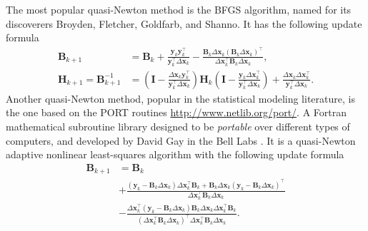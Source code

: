 The most popular quasi-Newton method is the BFGS algorithm, named for
its discoverers Broyden, Fletcher, Goldfarb, and Shanno. It has the
following update formula
\begin{align*}
  \mathbf{B}_{k+1} &= \mathbf{B}_{k} +
                     \frac{\mathbf{y}_{k}\mathbf{y}_{k}^{\top}}{
                     \mathbf{y}_{k}^{\top}\Delta\bm{x}_{k}} -
                     \frac{\mathbf{B}_{k}\Delta\bm{x}_{k}
                     (\mathbf{B}_{k}\Delta\bm{x}_{k})^{\top}}{
                     \Delta\bm{x}_{k}^{\top}\mathbf{B}_{k}
                     \Delta\bm{x}_{k}},\\
  \mathbf{H}_{k+1} = \mathbf{B}_{k+1}^{-1}
                   &= \left(
                     \mathbf{I} -
                     \frac{\Delta\bm{x}_{k}\mathbf{y}_{k}^{\top}}{
                     \mathbf{y}_{k}^{\top}\Delta\bm{x}_{k}}
                     \right) \mathbf{H}_{k}
                     \left(
                     \mathbf{I} -
                     \frac{\mathbf{y}_{k}\Delta\bm{x}_{k}^{\top}}{
                     \mathbf{y}_{k}^{\top}\Delta\bm{x}_{k}}
                     \right) +
                     \frac{\Delta\bm{x}_{k}
                     \Delta\bm{x}_{k}^{\top}}{
                     \mathbf{y}_{k}^{\top}\Delta\bm{x}_{k}}.
\end{align*}
Another quasi-Newton method, popular in the statistical modeling
literature, is the one based on the PORT routines
\url{http://www.netlib.org/port/}. A Fortran mathematical subroutine
library designed to be \textit{portable} over different types of
computers, and developed by David Gay in the Bell Labs
\cite{PORTreport}. It is a quasi-Newton adaptive nonlinear least-squares
algorithm \cite{PORTpaper} with the following update formula
\begin{align*}
  \mathbf{B}_{k+1} &= \mathbf{B}_{k}\\
                   &+ \frac{
                     \left(\mathbf{y}_{k} -
                     \mathbf{B}_{k}\Delta\bm{x}_{k}\right)
                     \Delta\bm{x}_{k}^{\top}\mathbf{B}_{k} +
                     \mathbf{B}_{k}\Delta\bm{x}_{k}
                     \left(\mathbf{y}_{k} -
                     \mathbf{B}_{k}\Delta\bm{x}_{k}\right)^{\top}}{
                     \Delta\bm{x}_{k}^{\top}\mathbf{B}_{k}
                     \Delta\bm{x}_{k}}\\
                   &- \frac{\Delta\bm{x}_{k}^{\top}
                     \left(\mathbf{y}_{k} -
                     \mathbf{B}_{k}\Delta\bm{x}_{k}\right)
                     \mathbf{B}_{k}\Delta\bm{x}_{k}
                     \Delta\bm{x}_{k}^{\top}\mathbf{B}_{k}}{
                     \left(\Delta\bm{x}_{k}^{\top}\mathbf{B}_{k}
                     \Delta\bm{x}_{k}\right)^{\top}
                     \Delta\bm{x}_{k}^{\top}\mathbf{B}_{k}
                     \Delta\bm{x}_{k}}.
\end{align*}
